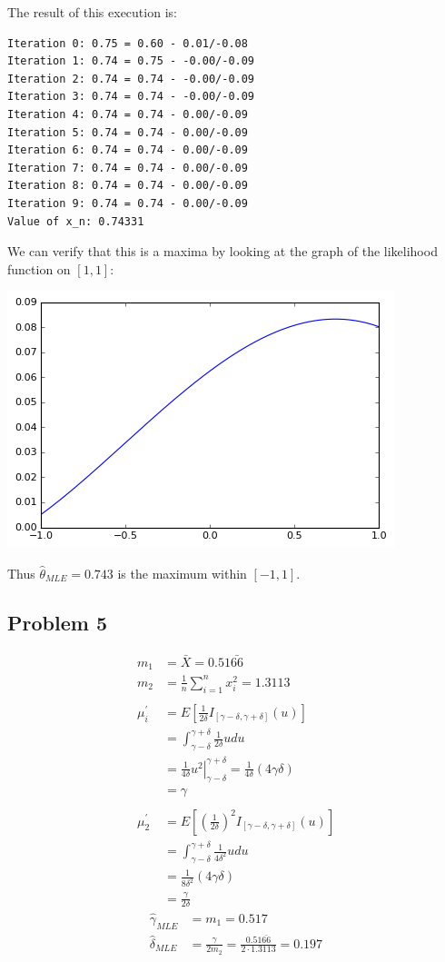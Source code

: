 \documentclass{article}
\begin{document}
The result of this execution is:
\begin{verbatim}
Iteration 0: 0.75 = 0.60 - 0.01/-0.08
Iteration 1: 0.74 = 0.75 - -0.00/-0.09
Iteration 2: 0.74 = 0.74 - -0.00/-0.09
Iteration 3: 0.74 = 0.74 - -0.00/-0.09
Iteration 4: 0.74 = 0.74 - 0.00/-0.09
Iteration 5: 0.74 = 0.74 - 0.00/-0.09
Iteration 6: 0.74 = 0.74 - 0.00/-0.09
Iteration 7: 0.74 = 0.74 - 0.00/-0.09
Iteration 8: 0.74 = 0.74 - 0.00/-0.09
Iteration 9: 0.74 = 0.74 - 0.00/-0.09
Value of x_n: 0.74331
\end{verbatim}
We can verify that this is a maxima by looking at the graph of the likelihood function on $[1,1]$:

\begin{center}\includegraphics[scale=0.8]{hw3_4_graph}\end{center}

Thus $\hat{\theta}_{MLE}=0.743$ is the maximum within $[-1,1]$. 

\subsection*{Problem 5}
\begin{align*}
m_1 &= \bar{X} = 0.51\bar{66} \\
m_2 &= \frac{1}{n}\sum^n_{i=1}x_i^2 = 1.3113 \\ \\
\mu_i^\prime &= E\left[\frac{1}{2\delta}I_{[\gamma-\delta, \gamma+\delta]}(u)\right] \\ 
&= \int^{\gamma+\delta}_{\gamma-\delta}\frac{1}{2\delta}udu \\
&=\frac{1}{4\delta}\left.u^2\right|^{\gamma+\delta}_{\gamma-\delta} = \frac{1}{4\delta}\left(4\gamma\delta\right)\\
& = \gamma \\ \\
\mu_2^\prime &= E\left[\left(\frac{1}{2\delta}\right)^2 I_{[\gamma-\delta, \gamma+\delta]}(u)\right] \\
&= \int^{\gamma+\delta}_{\gamma-\delta}\frac{1}{4\delta^2}udu \\
&= \frac{1}{8\delta^2}\left(4\gamma\delta\right) \\
&= \frac{\gamma}{2\delta}
\end{align*}
\begin{align*}
\hat{\gamma}_{MLE} & = m_1 = 0.517 \\
\hat{\delta}_{MLE} & = \frac{\gamma}{2m_2} = \frac{0.51\bar{66}}{2\cdot1.3113} = 0.197
\end{align*}
\end{document}
